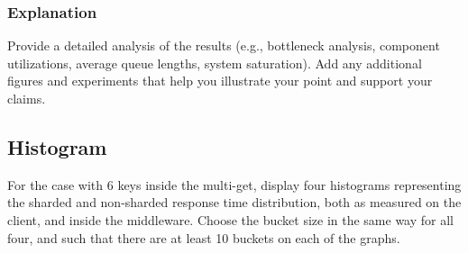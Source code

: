 \documentclass[11pt,a4paper]{article}
\begin{document}
\subsubsection{Explanation}

Provide a detailed analysis of the results (e.g., bottleneck analysis, component utilizations, average queue lengths, system saturation). Add any additional figures and experiments that help you illustrate your point and support your claims.

\subsection{Histogram}

For the case with 6 keys inside the multi-get, display four histograms representing the sharded and non-sharded response time distribution, both as measured on the client, and inside the middleware. Choose the bucket size in the same way for all four, and such that there are at least 10 buckets on each of the graphs.
\end{document}
